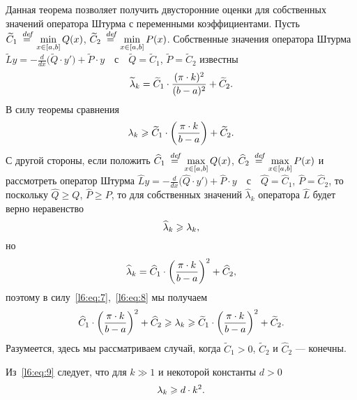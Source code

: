 \documentclass[12pt,a4paper,openany,fleqn]{book}
\newcommand {\defeq}{\stackrel{\hspace{0.09 cm}de\!f}{=}}
\newcommand {\eqdef}{\defeq}
\newcommand{\der}[2]{\ensuremath{\frac{d#1}{d#2}}}
\theoremstyle{definition}
\begin{document}
	Данная теорема позволяет получить двусторонние оценки для собственных значений оператора Штурма с переменными коэффициентами. Пусть $\widetilde{C}_1\eqdef\min\limits_{x\in[a,b]}Q(x)$, $\widetilde{C}_2\eqdef\min\limits_{x\in[a,b]}P(x)$. Собственные значения оператора Штурма $\widetilde{L}y=-\der{}{x}\Big(\widetilde{Q}\cdot y'\Big)+\widetilde{P}\cdot y\quad$с$\quad\widetilde{Q}=\widetilde{C}_1$, $\widetilde{P}=\widetilde{C}_2$ известны 
	\begin{equation*}
		\hfill\widetilde{\lambda}_k=\widetilde{C}_1\cdot\frac{(\pi\cdot k)^2}{(b-a)^2}+\widetilde{C}_2.\hfill
	\end{equation*}
	В силу теоремы сравнения
	\begin{equation}
		\label{l6:eq:7}
		\hfill\lambda_k\geqslant\widetilde{C}_1\cdot\left(\frac{\pi\cdot k}{b-a}\right)+\widetilde{C}_2.\hfill
	\end{equation}
	С другой стороны, если положить $\widehat{C}_1\eqdef\max\limits_{x\in[a,b]}Q(x)$, $\widehat{C}_2\eqdef\max\limits_{x\in[a,b]}P(x)$ и рассмотреть оператор Штурма $\widehat{L}y=-\der{}{x}\Big(\widehat{Q}\cdot y'\Big)+\widehat{P}\cdot y\quad$с$\quad\widehat{Q}=\widehat{C}_1$, $\widehat{P}=\widehat{C}_2$, то поскольку $\widehat{Q}\geqslant Q$, $\widehat{P}\geqslant P$, то для собственных значений $\widehat{\lambda}_k$ оператора $\widehat{L}$ будет верно неравенство
	\begin{equation}
		\label{l6:eq:8}
		\hfill \widehat{\lambda}_k\geqslant\lambda_k,\hfill
	\end{equation}
	но 
	\begin{equation*}
		\hfill\widehat{\lambda}_k=\widehat{C}_1\cdot \left(\frac{\pi\cdot k}{b-a}\right)^2+\widehat{C}_2,\hfill
	\end{equation*}
	поэтому в силу~\eqref{l6:eq:7},~\eqref{l6:eq:8} мы получаем
	\begin{equation}
		\label{l6:eq:9}
		\hfill\widehat{C}_1\cdot\left(\frac{\pi\cdot k}{b-a}\right)^2+\widehat{C}_2\geqslant\lambda_k\geqslant\widetilde{C}_1\cdot\left(\frac{\pi\cdot k}{b-a}\right)^2+\widetilde{C}_2.\hfill
	\end{equation}
	Разумеется, здесь мы рассматриваем случай, когда $\widetilde{C}_1>0$, $\widetilde{C}_2$ и $\widehat{C}_2$ --- конечны. 
	
	Из~\eqref{l6:eq:9} следует, что для $k\gg1$ и некоторой константы $d>0$ 
	\begin{equation}
		\label{l6:eq:10}
		\hfill\lambda_k\geqslant d\cdot k^2.\hfill
	\end{equation} 
\end{document}
